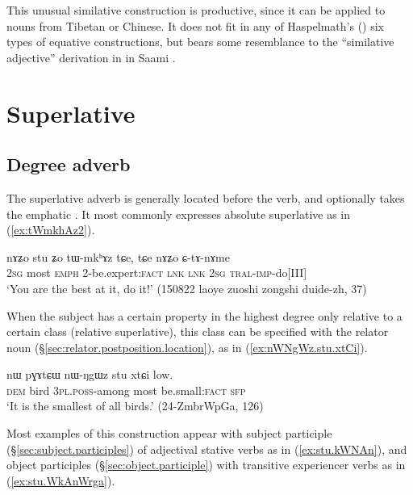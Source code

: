 This unusual similative construction is productive, since it can be applied to nouns from Tibetan or Chinese. It does not fit in any of Haspelmath's (\citeyear{haspelmath17equative}) six types of equative constructions, but bears some resemblance to the ``similative adjective'' derivation in  in Saami \citep[5.1]{ylikovski17similarity}. 


\section{Superlative} \label{sec:superlative}

 \subsection{Degree adverb} \label{sec:stu.superlative}
The superlative adverb  is generally located before the verb, and optionally takes the emphatic . It most commonly expresses absolute superlative as in  (\ref{ex:tWmkhAz2}).
 

 \begin{exe}
\ex \label{ex:tWmkhAz2}
\gll nɤʑo stu ʑo tɯ-mkʰɤz tɕe, tɕe nɤʑo ɕ-tɤ-nɤme \\
\textsc{2sg} most \textsc{emph} 2-be.expert:\textsc{fact}   \textsc{lnk} \textsc{lnk} \textsc{2sg} \textsc{tral}-\textsc{imp}-do[III] \\
\glt `You are the best at it, do it!' (150822 laoye zuoshi zongshi duide-zh, 37)
\end{exe}

When the subject has a certain property in the highest degree only relative to a certain class (relative superlative), this class can be specified with the relator noun  (§\ref{sec:relator.postposition.location}), as in  (\ref{ex:nWNgWz.stu.xtCi}).

 
\begin{exe}
\ex \label{ex:nWNgWz.stu.xtCi}
\gll nɯ pɣɤtɕɯ nɯ-ŋgɯz stu xtɕi low.\\
\textsc{dem} bird \textsc{3pl}.\textsc{poss}-among most be.small:\textsc{fact} \textsc{sfp} \\
\glt `It is the smallest of all birds.' (24-ZmbrWpGa, 126)
\end{exe}

Most examples of this construction appear with subject participle (§\ref{sec:subject.participles}) of adjectival stative verbs as in (\ref{ex:stu.kWNAn}), and object participles (§\ref{sec:object.participle}) with transitive experiencer verbs as in (\ref{ex:stu.WkAnWrga}).

